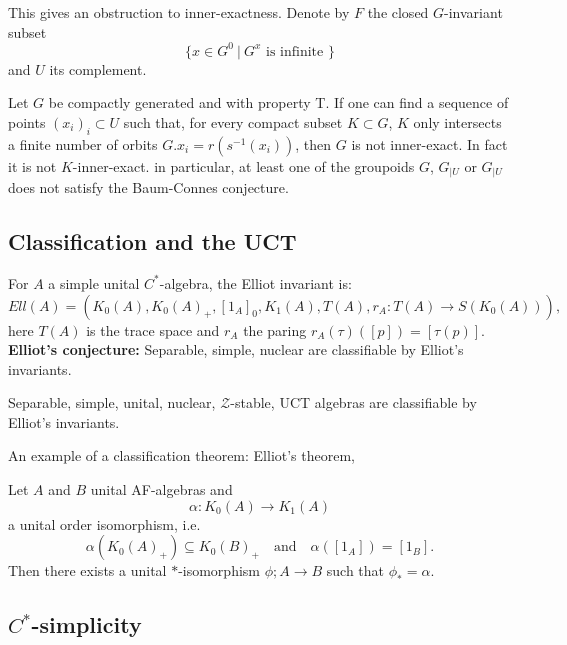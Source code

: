 This gives an obstruction to inner-exactness. Denote by $F$ the closed $G$-invariant subset 
\[\{x\in G^0 \ | \ G^x \text{ is infinite }\}\]
and $U$ its complement.\\

\begin{thm}
Let $G$ be compactly generated and with property T. If one can find a sequence of points $(x_i)_i\subset U$ such that, for every compact subset $K \subset G$, $K$ only intersects a finite number of orbits $G.x_i = r(s^{-1}(x_i))$, then $G$ is not inner-exact. In fact it is not $K$-inner-exact. in particular, at least one of the groupoids $G$, $G_{|U}$ or $G_{|U}$ does not satisfy the Baum-Connes conjecture.
\end{thm}

\subsection{Classification and the UCT}

For $A$ a simple unital $C^*$-algebra, the Elliot invariant is:
\[Ell(A) = \left( K_0(A), K_0(A)_+ , [1_A]_0 , K_1(A), T(A) , r_A : T(A) \rightarrow S(K_0(A)) \right) ,\]
here $T(A)$ is the trace space and $r_A$ the paring $r_A(\tau)([p]) = [\tau(p)]$.\\

\textbf{Elliot's conjecture:} Separable, simple, nuclear are classifiable by Elliot's invariants.

\begin{thm}
Separable, simple, unital, nuclear, $\mathcal Z$-stable, UCT algebras are classifiable by Elliot's invariants.
\end{thm}

An example of a classification theorem: Elliot's theorem,

\begin{thm}
Let $A$ and $B$ unital AF-algebras and \[\alpha : K_0(A) \rightarrow K_1(A)\]
a unital order isomorphism, i.e. \[\alpha(K_0(A)_+) \subseteq K_0(B)_+ \quad \text{and} \quad \alpha([1_A])=[1_B].\]
Then there exists a unital $*$-isomorphism $\phi; A\rightarrow B$ such that $\phi_*=\alpha$.
\end{thm}

\newpage
\subsection{$C^*$-simplicity}

